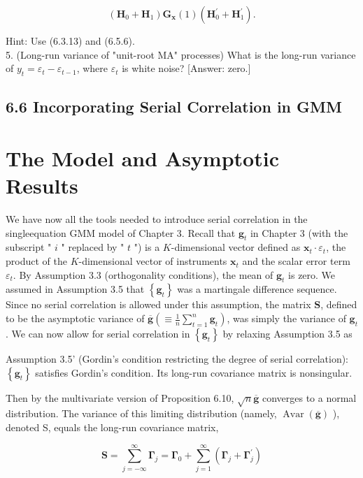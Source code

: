 \documentclass[10pt]{article}
\begin{document}
$$
\left(\mathbf{H}_{0}+\mathbf{H}_{1}\right) \mathbf{G}_{\mathbf{x}}(1)\left(\mathbf{H}_{0}^{\prime}+\mathbf{H}_{1}^{\prime}\right) .
$$

Hint: Use (6.3.13) and (6.5.6).\\
5. (Long-run variance of "unit-root MA" processes) What is the long-run variance of $y_{t}=\varepsilon_{t}-\varepsilon_{t-1}$, where $\varepsilon_{t}$ is white noise? [Answer: zero.]

\subsection*{6.6 Incorporating Serial Correlation in GMM}
\section*{The Model and Asymptotic Results}
We have now all the tools needed to introduce serial correlation in the singleequation GMM model of Chapter 3. Recall that $\mathbf{g}_{t}$ in Chapter 3 (with the subscript " $i$ " replaced by " $t$ ") is a $K$-dimensional vector defined as $\mathbf{x}_{t} \cdot \varepsilon_{t}$, the product of the $K$-dimensional vector of instruments $\mathbf{x}_{t}$ and the scalar error term $\varepsilon_{t}$. By Assumption 3.3 (orthogonality conditions), the mean of $\mathbf{g}_{t}$ is zero. We assumed in Assumption 3.5 that $\left\{\mathbf{g}_{t}\right\}$ was a martingale difference sequence. Since no serial correlation is allowed under this assumption, the matrix $\mathbf{S}$, defined to be the asymptotic variance of $\overline{\mathbf{g}}\left(\equiv \frac{1}{n} \sum_{t=1}^{n} \mathbf{g}_{t}\right)$, was simply the variance of $\mathbf{g}_{t}$. We can now allow for serial correlation in $\left\{\mathbf{g}_{t}\right\}$ by relaxing Assumption 3.5 as

Assumption 3.5' (Gordin's condition restricting the degree of serial correlation): $\left\{\mathbf{g}_{t}\right\}$ satisfies Gordin's condition. Its long-run covariance matrix is nonsingular.

Then by the multivariate version of Proposition 6.10, $\sqrt{n} \overline{\mathbf{g}}$ converges to a normal distribution. The variance of this limiting distribution (namely, $\operatorname{Avar}(\overline{\mathbf{g}})$ ), denoted S, equals the long-run covariance matrix,


\begin{equation*}
\mathbf{S}=\sum_{j=-\infty}^{\infty} \boldsymbol{\Gamma}_{j}=\boldsymbol{\Gamma}_{0}+\sum_{j=1}^{\infty}\left(\boldsymbol{\Gamma}_{j}+\boldsymbol{\Gamma}_{j}^{\prime}\right) \tag{6.6.1}
\end{equation*}
\end{document}
